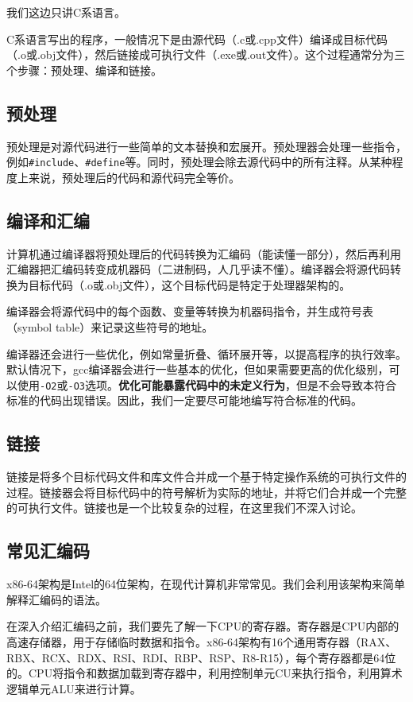 \documentclass[../main.tex]{subfiles}
\begin{document}
我们这边只讲C系语言。

C系语言写出的程序，一般情况下是由源代码（.c或.cpp文件）编译成目标代码（.o或.obj文件），然后链接成可执行文件（.exe或.out文件）。这个过程通常分为三个步骤：预处理、编译和链接。

\subsection{预处理}
预处理是对源代码进行一些简单的文本替换和宏展开。预处理器会处理一些指令，例如\texttt{\#include}、\texttt{\#define}等。同时，预处理会除去源代码中的所有注释。从某种程度上来说，预处理后的代码和源代码完全等价。

\subsection{编译和汇编}
计算机通过编译器将预处理后的代码转换为汇编码（能读懂一部分），然后再利用汇编器把汇编码转变成机器码（二进制码，人几乎读不懂）。编译器会将源代码转换为目标代码（.o或.obj文件），这个目标代码是特定于处理器架构的。

编译器会将源代码中的每个函数、变量等转换为机器码指令，并生成符号表（symbol table）来记录这些符号的地址。

编译器还会进行一些优化，例如常量折叠、循环展开等，以提高程序的执行效率。默认情况下，gcc编译器会进行一些基本的优化，但如果需要更高的优化级别，可以使用\texttt{-O2}或\texttt{-O3}选项。\textbf{优化可能暴露代码中的未定义行为}，但是不会导致本符合标准的代码出现错误。因此，我们一定要尽可能地编写符合标准的代码。

\subsection{链接}
链接是将多个目标代码文件和库文件合并成一个基于特定操作系统的可执行文件的过程。链接器会将目标代码中的符号解析为实际的地址，并将它们合并成一个完整的可执行文件。链接也是一个比较复杂的过程，在这里我们不深入讨论。

\subsection{常见汇编码}

x86-64架构是Intel的64位架构，在现代计算机非常常见。我们会利用该架构来简单解释汇编码的语法。

在深入介绍汇编码之前，我们要先了解一下CPU的寄存器。寄存器是CPU内部的高速存储器，用于存储临时数据和指令。x86-64架构有16个通用寄存器（RAX、RBX、RCX、RDX、RSI、RDI、RBP、RSP、R8-R15），每个寄存器都是64位的。CPU将指令和数据加载到寄存器中，利用控制单元CU来执行指令，利用算术逻辑单元ALU来进行计算。
\end{document}
